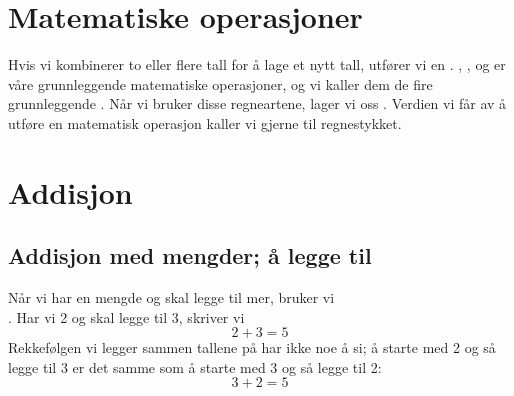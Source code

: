 




\newpage
\section{Matematiske operasjoner}
Hvis vi kombinerer to eller flere tall for å lage et nytt tall, utfører vi en . , ,  og  er våre grunnleggende matematiske operasjoner, og vi kaller dem de fire grunnleggende . Når vi bruker disse regneartene, lager vi oss . Verdien vi får av å utføre en matematisk operasjon kaller vi gjerne  til regnestykket.

\section{Addisjon \label{Addisjon} }	
\subsection*{Addisjon med mengder; å legge til}
Når vi har en mengde og skal legge til mer, bruker vi  \\
\sym{$ + $}
\!\!. Har vi 2 og skal legge til 3, skriver vi 
\[ 2+3=5 \]
{}
Rekkefølgen vi legger sammen tallene på har ikke  noe å si; å starte med 2 og så legge til 3 er det samme som å starte med 3 og så legge til 2:
\[ 3+2=5 \]
{}
 \regv
\newpage
{}

